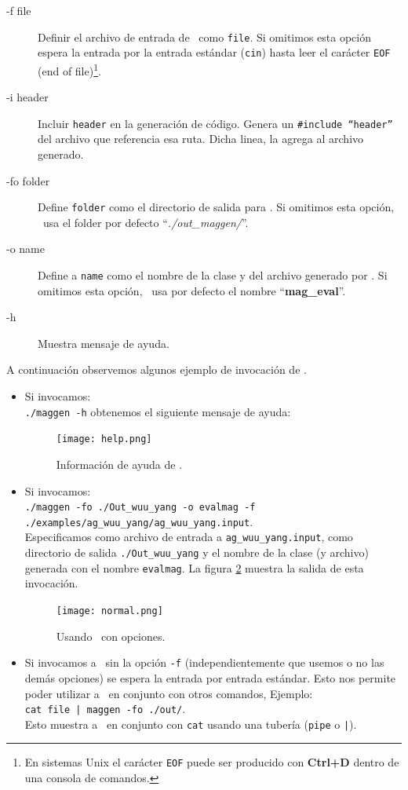 \begin{description}
\item [-f  file] Definir el archivo de entrada de \maggen\ como \texttt{file}. Si omitimos esta opción \maggen espera la entrada por la entrada estándar (\texttt{cin}) hasta leer el carácter \texttt{EOF} (end of file)\footnote{En sistemas Unix el carácter \texttt{EOF} puede ser producido con \textbf{Ctrl+D} dentro de una consola de comandos.}.
\item [-i  header] Incluir \texttt{header} en la generación de código. Genera un \texttt{\#include ``header''} del archivo que referencia esa ruta. Dicha linea, \maggen la agrega al archivo generado.
\item [-fo folder] Define \texttt{folder} como el directorio de salida para \maggen. Si omitimos esta opción, \maggen\ usa el folder por defecto ``\textit{./out\_maggen/}''.
\item [-o  name] Define a \texttt{name} como el nombre de la clase y del archivo generado por \maggen. Si omitimos esta opción, \maggen\ usa por defecto el nombre ``\textbf{mag\_eval}''.
\item [-h] Muestra mensaje de ayuda.
\end{description}

A continuación observemos algunos ejemplo de invocación de \maggen.
\begin{itemize}
\item Si invocamos:\\ \texttt{./maggen -h} obtenemos el siguiente mensaje de ayuda:

\begin{figure}[h!]\centering
\texttt{[image: help.png]}
\caption{\label{fig:outhelp} Información de ayuda de \maggen.}
\end{figure}

\item Si invocamos: \\ \texttt{./maggen -fo ./Out\_wuu\_yang -o evalmag -f ./examples/ag\_wuu\_yang/ag\_wuu\_yang.input}. \\ Especificamos como archivo de entrada a \texttt{ag\_wuu\_yang.input}, como directorio de salida \texttt{./Out\_wuu\_yang} y el nombre de la clase (y archivo) generada con el nombre \texttt{evalmag}. La figura \ref{fig:outnormal} muestra la salida de esta invocación.

\begin{figure}[h!]\centering
\texttt{[image: normal.png]}
\caption{\label{fig:outnormal} Usando \maggen\ con opciones.}
\end{figure}

\item Si invocamos a \maggen\ sin la opción \texttt{-f} (independientemente que usemos o no las demás opciones) se espera la entrada por entrada estándar. Esto nos permite poder utilizar a \maggen\ en conjunto con otros comandos, Ejemplo:\\ \texttt{cat file | maggen -fo ./out/}.\\ Esto muestra a \maggen\ en conjunto con \texttt{cat} usando una tubería (\texttt{pipe} o \texttt{|}).

\end{itemize}

